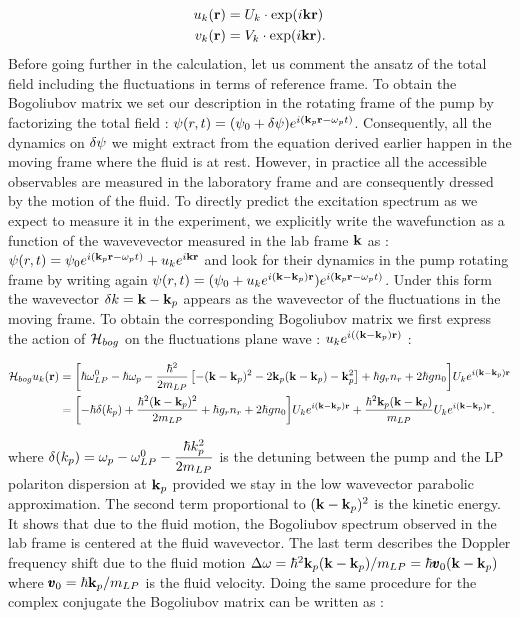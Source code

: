 \begin{subequations}
    \begin{align}
        u_k(\mathbf{r})&=U_k\cdot\mathrm{exp}(i\mathbf{k}\mathbf{r}) \\
        v_k(\mathbf{r})&=V_k \cdot\mathrm{exp}(i\mathbf{k}\mathbf{r}).
    \end{align}
\end{subequations}
Before going further in the calculation, let us comment the ansatz of the total field including the fluctuations in terms of reference frame. To obtain the Bogoliubov matrix 
we set our description in the rotating frame of the pump by factorizing the total field : $\psi(r,t)=(\psi_0+\delta\psi)e^{i(\mathbf{k}_p\mathbf{r}-\omega_pt)}$. Consequently, all the dynamics on $\delta\psi$ we might extract from the equation derived earlier
happen in the moving frame where the fluid is at rest. However, in practice all the accessible observables are measured in the laboratory frame and are consequently dressed by the motion of the fluid. To directly predict the excitation spectrum as we expect to measure it in the experiment,
we explicitly write the wavefunction as a function of the wavevevector measured in the lab frame $\mathbf{k}$ as : $\psi(r,t)=\psi_0e^{i(\mathbf{k}_p\mathbf{r}-\omega_pt)}+ u_k e^{i\mathbf{k}\mathbf{r}}$ and look for their dynamics in the pump rotating frame by writing again $\psi(r,t)=(\psi_0+u_ke^{i(\mathbf{k}-\mathbf{k}_p)\mathbf{r}})e^{i(\mathbf{k}_p\mathbf{r}-\omega_pt)}$. Under this form
the wavevector $\delta k=\mathbf{k}-\mathbf{k}_p$ appears as the wavevector of the fluctuations in the moving frame. 
To obtain the corresponding Bogoliubov matrix we first express the action of $\mathcal{H}_{bog}$ on the fluctuations plane wave : $u_ke^{i((\mathbf{k}-\mathbf{k}_p)\mathbf{r})}$ :

\begin{equation}
    \begin{align}
    \mathcal{H}_{bog}u_k(\mathbf{r}) &= \biggl[\hbar\omega_{LP}^0 - \hbar \omega_p-\dfrac{\hbar^2}{2m_{LP}}\left[-(\mathbf{k}-\mathbf{k}_p)^2 -2\mathbf{k}_p(\mathbf{k}-\mathbf{k}_p)-\mathbf{k}_p^2\right]+\hbar g_rn_r + 2\hbar g n_0 \biggr]U_ke^{i(\mathbf{k}-\mathbf{k}_p)\mathbf{r}} \\
            &= \biggl[-\hbar\delta(k_p)+\dfrac{\hbar^2(\mathbf{k}-\mathbf{k}_p)^2}{2m_{LP}}+\hbar g_rn_r + 2\hbar g n_0\biggr]U_ke^{i(\mathbf{k}-\mathbf{k}_p)\mathbf{r}} + \dfrac{\hbar^2\mathbf{k}_p(\mathbf{k}-\mathbf{k}_p)}{m_{LP}}U_ke^{i(\mathbf{k}-\mathbf{k}_p)\mathbf{r}}.
    \end{align}
    \label{eq:ham_bog_plane_wave}
\end{equation}

where $\delta(k_p)=\omega_p - \omega_{LP}^0 - \dfrac{\hbar k_p^2}{2m_{LP}}$ is the detuning between the pump and the LP polariton dispersion at $\mathbf{k}_p$ provided we stay in the low wavevector
parabolic approximation. The second term proportional to $(\mathbf{k}-\mathbf{k}_p)^2$ is the kinetic energy. It shows that due to the fluid motion, the Bogoliubov spectrum observed in the lab frame is 
centered at the fluid wavevector. The last term describes the Doppler frequency shift due to the fluid motion  $\Delta\omega =\hbar^2\mathbf{k}_p(\mathbf{k}-\mathbf{k}_p)/m_{LP}=\hbar\pmb{v}_0(\mathbf{k}-\mathbf{k}_p)$ where $\pmb{v}_0=\hbar\mathbf{k}_p/m_{LP}$ is the fluid velocity.
Doing the same procedure for the complex conjugate the Bogoliubov matrix can be written as :



